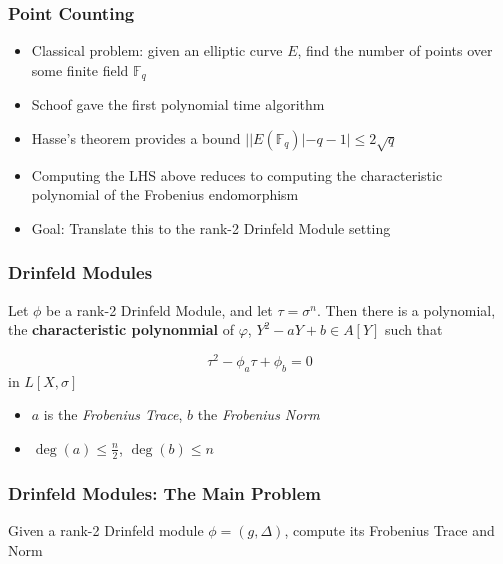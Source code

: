 \documentclass{beamer}
\begin{document}

\begin{frame}
\frametitle{Point Counting}

\begin{itemize}
\item Classical problem: given an elliptic curve $E$, find the number of points over some finite field $\mathbb{F}_q$ 
\item Schoof gave the first polynomial time algorithm
\item Hasse's theorem provides a bound $ | |E(\mathbb{F}_q)| - q - 1  | \leq 2 \sqrt{q} $

\item Computing the LHS above reduces to computing the characteristic polynomial of the Frobenius endomorphism

\item Goal: Translate this to the rank-2 Drinfeld Module setting
\end{itemize}

\end{frame}









\begin{frame}
\frametitle{Drinfeld Modules}

\begin{theorem}[Gekeler, 1991]
Let $\phi$ be a rank-2 Drinfeld Module, and let $\tau = \sigma^n$. Then there is a polynomial, the \textbf{characteristic polynonmial} of $\varphi$,  $Y^2 - aY +b \in A[Y]$ such that

\[\tau^2 -\phi_a\tau + \phi_b = 0\]
in $L[X,\sigma]$
\end{theorem}

\begin{itemize}
    \item $a$ is the \textit{Frobenius Trace}, $b$ the \textit{Frobenius Norm}
    \item $\deg(a) \leq \frac{n}{2}$, $\deg(b) \leq n$
\end{itemize}

\end{frame}


\begin{frame}
\frametitle{Drinfeld Modules: The Main Problem}

\begin{problem}
Given a rank-2 Drinfeld module $\phi = (g,\Delta)$, compute its Frobenius Trace and Norm
\end{problem}

\end{frame}
\end{document}
